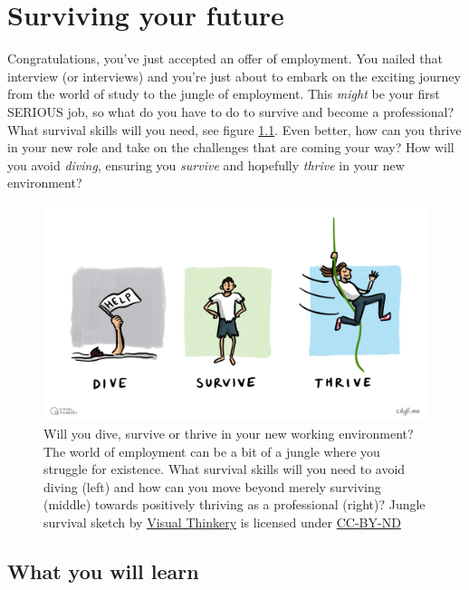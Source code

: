 \documentclass[
]{book}
\begin{document}
\hypertarget{surviving}{%
\chapter{Surviving your future}\label{surviving}}

Congratulations, you've just accepted an offer of employment. You nailed that interview (or interviews) and you're just about to embark on the exciting journey from the world of study to the jungle of employment. This \emph{might} be your first SERIOUS job, so what do you have to do to survive and become a professional? What survival skills will you need, see figure \ref{fig:survival-fig}. Even better, how can you thrive in your new role and take on the challenges that are coming your way? How will you avoid \emph{diving}, ensuring you \emph{survive} and hopefully \emph{thrive} in your new environment? 💪

\begin{figure}

{\centering \includegraphics[width=1\linewidth]{images/Dive Thrive Survive} 

}

\caption{Will you dive, survive or thrive in your new working environment? The world of employment can be a bit of a jungle where you struggle for existence. What survival skills will you need to avoid diving (left) and how can you move beyond merely surviving (middle) towards positively thriving as a professional (right)? Jungle survival sketch by \href{https://visualthinkery.com}{Visual Thinkery} is licensed under \href{https://creativecommons.org/licenses/by-nd/4.0/}{CC-BY-ND}}\label{fig:survival-fig}
\end{figure}



\hypertarget{ilo10}{%
\section{What you will learn}\label{ilo10}}
\end{document}
